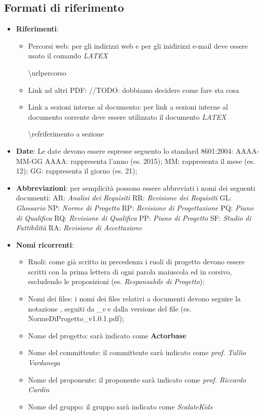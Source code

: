 \subsection{Formati di riferimento}
\begin{itemize}
\item \textbf{Riferimenti}:
	\begin{itemize} 
	\item Percorsi web: per gli indirizzi web e per gli inidirizzi e-mail deve essere usato il comando \textit{LATEX} 
 	\begin{center}
 	\textbackslash{url{percorso}}
 	\end{center}
	\item Link ad altri PDF: //TODO: dobbiamo decidere come fare sta cosa
	\item Link a sezioni interne al documento: per link a sezioni interne al documento corrente deve essere utilizzato il documento \textit{LATEX}
	\begin{center} 
	\textbackslash{ref{riferimento a sezione}}
	\end{center}
	\end{itemize}
\item \textbf{Date}: Le date devono essere espresse seguento lo standard \textit{} 8601:2004:
	AAAA-MM-GG
	AAAA: rappresenta l'anno (es. 2015);
	MM:	rappresenta il mese (es. 12);
	GG: rappresenta il giorno (es. 21);

\item \textbf{Abbreviazioni}: per semplicità possono essere abbreviati i nomi dei seguenti documenti:
	AR: \textit{Analisi dei Requisiti}
	RR: \textit{Revisione dei Requisiti}
	GL: \textit{Glossario}
	NP: \textit{Norme di Progetto}
	RP: \textit{Revisione di Progettazione}
	PQ: \textit{Piano di Qualifica}
	RQ: \textit{Revisione di Qualifica}
	PP: \textit{Piano di Progetto}
	SF: \textit{Studio di Fattibilità}
	RA: \textit{Revisione di Accettazione}

\item \textbf{Nomi ricorrenti}:
	\begin{itemize}
	\item Ruoli: come già scritto in precedenza i ruoli di progetto devono essere scritti con la prima lettera di ogni parola maiuscola ed in corsivo, escludendo le proposizioni (es. \textit{Responsabile di Progetto});
	\item Nomi dei files: i nomi dei files relativi a documenti devono seguire la notazione \textit{}, seguiti da \textit{_v} e dalla versione del file (es. NormeDiProgetto_v1.0.1.pdf);
	\item Nome del progetto: sarà indicato come \textbf{Actorbase}
	\item Nome del committente: il committente sarà indicato come \textit{prof. Tullio Vardanega}
	\item Nome del proponente: il proponente sarà indicato come \textit{prof. Riccardo Cardin}
	\item Nome del gruppo: il gruppo sarà indicato come \textit{ScalateKids}
	\end{itemize}
\end{itemize}

